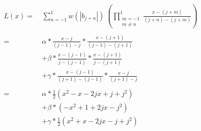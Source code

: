 \documentclass[a4paper,10pt,twocolumn]{article}
\begin{document}
\begin{align*}
    L(x) =\ & \sum_{n=-1}^{1} w(|b_{j + n}|) \ \left(\prod_{\substack{m=-1\\m \neq n}}^{1} \frac{x - (j + m)}{(j + n) - (j + m)}\right) \\
\\[-2mm]
         =\ & \alpha * \frac{x - j}      {(j - 1) - j}       * \frac{x - (j + 1)}{(j - 1) - (j + 1)} \\
         &+ \beta    * \frac{x - (j - 1)}{j - (j - 1)}       * \frac{x - (j + 1)}{j - (j + 1)} \\
         &+ \gamma   * \frac{x - (j - 1)}{(j + 1) - (j - 1)} * \frac{x - j}      {(j + 1) - j} \\
\\[-2mm]
         =\ & \alpha * \frac{1}{2}(x^2 - x - 2jx + j + j^2) \\
         &+ \beta    * (-x^2 + 1 + 2jx - j^2) \\
         &+ \gamma   * \frac{1}{2}(x^2 + x - 2jx - j + j^2)
\end{align*}
\end{document}

